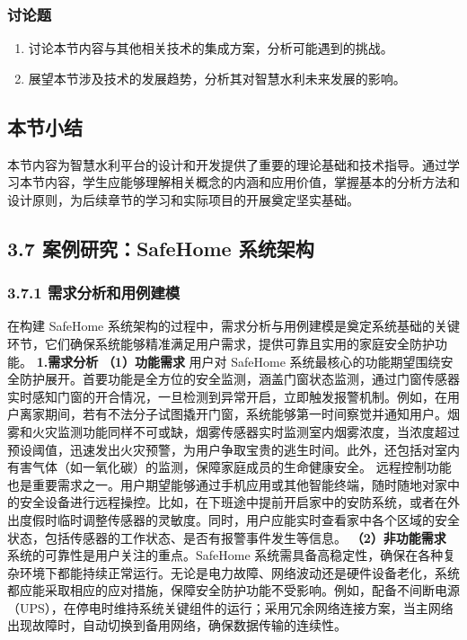 \subsubsection{讨论题}\label{ux8ba8ux8bbaux9898-2} \begin{enumerate} \def\labelenumi{\arabic{enumi}.} \tightlist \item
讨论本节内容与其他相关技术的集成方案，分析可能遇到的挑战。 \item 展望本节涉及技术的发展趋势，分析其对智慧水利未来发展的影响。 \end{enumerate}
\subsection{本节小结}\label{ux672cux8282ux5c0fux7ed3-2}
本节内容为智慧水利平台的设计和开发提供了重要的理论基础和技术指导。通过学习本节内容，学生应能够理解相关概念的内涵和应用价值，掌握基本的分析方法和设计原则，为后续章节的学习和实际项目的开展奠定坚实基础。 \subsection{3.7
案例研究：SafeHome 系统架构}\label{ux6848ux4f8bux7814ux7a76safehome-ux7cfbux7edfux67b6ux6784} \subsubsection{3.7.1
需求分析和用例建模}\label{ux9700ux6c42ux5206ux6790ux548cux7528ux4f8bux5efaux6a21} 在构建 SafeHome
系统架构的过程中，需求分析与用例建模是奠定系统基础的关键环节，它们确保系统能够精准满足用户需求，提供可靠且实用的家庭安全防护功能。 \textbf{1.需求分析} \textbf{（1）功能需求} 用户对 SafeHome
系统最核心的功能期望围绕安全防护展开。首要功能是全方位的安全监测，涵盖门窗状态监测，通过门窗传感器实时感知门窗的开合情况，一旦检测到异常开启，立即触发报警机制。例如，在用户离家期间，若有不法分子试图撬开门窗，系统能够第一时间察觉并通知用户。烟雾和火灾监测功能同样不可或缺，烟雾传感器实时监测室内烟雾浓度，当浓度超过预设阈值，迅速发出火灾预警，为用户争取宝贵的逃生时间。此外，还包括对室内有害气体（如一氧化碳）的监测，保障家庭成员的生命健康安全。
远程控制功能也是重要需求之一。用户期望能够通过手机应用或其他智能终端，随时随地对家中的安全设备进行远程操控。比如，在下班途中提前开启家中的安防系统，或者在外出度假时临时调整传感器的灵敏度。同时，用户应能实时查看家中各个区域的安全状态，包括传感器的工作状态、是否有报警事件发生等信息。
\textbf{（2）非功能需求} 系统的可靠性是用户关注的重点。SafeHome
系统需具备高稳定性，确保在各种复杂环境下都能持续正常运行。无论是电力故障、网络波动还是硬件设备老化，系统都应能采取相应的应对措施，保障安全防护功能不受影响。例如，配备不间断电源（UPS），在停电时维持系统关键组件的运行；采用冗余网络连接方案，当主网络出现故障时，自动切换到备用网络，确保数据传输的连续性。
